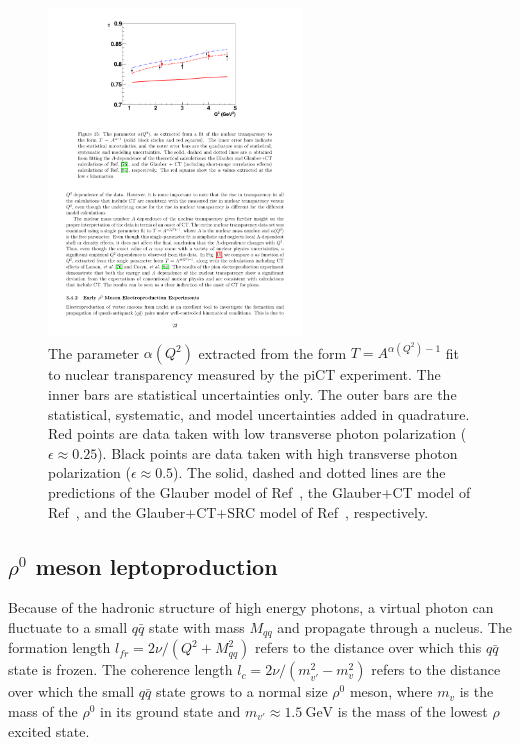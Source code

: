\begin{figure}[!h]
    \centering
    \includegraphics[width=0.6\textwidth]{chap2/pion_electroproduction_transparency_A_dependence.pdf}
    \caption{
            The parameter $\alpha(Q^2)$ extracted from the form
            $T=A^{\alpha(Q^2)-1}$
            fit to nuclear transparency measured by the piCT experiment.
            The inner bars are statistical uncertainties only.
            The outer bars are the statistical, systematic, and model
            uncertainties added in quadrature.
            Red points are data taken with low transverse photon polarization
            ($\epsilon\approx0.25$).
            Black points are data taken with high transverse photon polarization
            ($\epsilon\approx0.5$).
            The solid, dashed and dotted lines are the predictions of
            the Glauber model of Ref~\cite{Larson_2006},
            the Glauber+CT model of Ref~\cite{Larson_2006},
            and the Glauber+CT+SRC model of Ref~\cite{Cosyn_2006},
            respectively.
            }
    \label{fig:pion_electroproduction_transparency_A_dependence}
\end{figure}

\subsection{$\rho^0$ meson leptoproduction}
Because of the hadronic structure of high energy photons,
a virtual photon can fluctuate to a small $q\bar{q}$ state with mass $M_{qq}$
and propagate through a nucleus.
The formation length $l_{fr}=2\nu/(Q^2+M^2_{qq})$ refers to the distance over
which this $q\bar{q}$ state is frozen.
The coherence length $l_c=2\nu/(m^2_{v'}-m^2_{v})$ refers to the distance over
which the small $q\bar{q}$ state grows to a normal size $\rho^0$ meson,
where $m_v$ is the mass of the $\rho^0$ in its ground state
and $m_{v'}\approx\SI{1.5}{\giga\electronvolt}$ is the mass of the lowest $\rho$
excited state.


